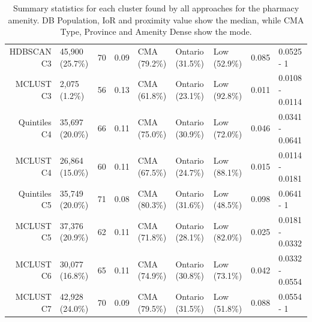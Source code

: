 \documentclass[11pt, a4paper]{article}
\begin{document}
\begin{table}[H]
{\begin{tabular}{|r|llllllll|}
  HDBSCAN C3 & 45,900 (25.7\%) & 70 & 0.09 & CMA (79.2\%) & Ontario (31.5\%) & Low (52.9\%) & 0.085 & 0.0525 - 1 \\ 
  MCLUST C3 & 2,075 (1.2\%) & 56 & 0.13 & CMA (61.8\%) & Ontario (23.1\%) & Low (92.8\%) & 0.011 & 0.0108 - 0.0114 \\ 
  Quintiles C4 & 35,697 (20.0\%) & 66 & 0.11 & CMA (75.0\%) & Ontario (30.9\%) & Low (72.0\%) & 0.046 & 0.0341 - 0.0641 \\ 
  MCLUST C4 & 26,864 (15.0\%) & 60 & 0.11 & CMA (67.5\%) & Ontario (24.7\%) & Low (88.1\%) & 0.015 & 0.0114 - 0.0181 \\ 
  Quintiles C5 & 35,749 (20.0\%) & 71 & 0.08 & CMA (80.3\%) & Ontario (31.6\%) & Low (48.5\%) & 0.098 & 0.0641 - 1 \\ 
  MCLUST C5 & 37,376 (20.9\%) & 62 & 0.11 & CMA (71.8\%) & Ontario (28.1\%) & Low (82.0\%) & 0.025 & 0.0181 - 0.0332 \\ 
  MCLUST C6 & 30,077 (16.8\%) & 65 & 0.11 & CMA (74.9\%) & Ontario (30.8\%) & Low (73.1\%) & 0.042 & 0.0332 - 0.0554 \\ 
  MCLUST C7 & 42,928 (24.0\%) & 70 & 0.09 & CMA (79.5\%) & Ontario (31.5\%) & Low (51.8\%) & 0.088 & 0.0554 - 1 \\ 
   \hline
\end{tabular}
}
\caption[Pharmacy cluster profiles]{Summary statistics for each cluster found by all approaches for the pharmacy amenity. DB Population, IoR and proximity value show the median, while CMA Type, Province and Amenity Dense show the mode.}\label{pharmacyprofiles}
\end{table}
\end{document}
